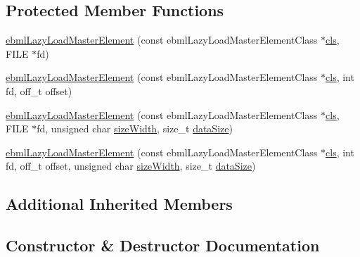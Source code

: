 \subsection*{Protected Member Functions}
\begin{DoxyCompactItemize}
\item 
\mbox{\hyperlink{classebml_1_1ebmlLazyLoadMasterElement_a7f1782a749ad36b8b453127c3ad105be}{ebml\+Lazy\+Load\+Master\+Element}} (const ebml\+Lazy\+Load\+Master\+Element\+Class $\ast$\mbox{\hyperlink{classebml_1_1ebmlMasterElement_a4073fb3f7ce3dda153384821714df29e}{cls}}, F\+I\+LE $\ast$fd)
\item 
\mbox{\hyperlink{classebml_1_1ebmlLazyLoadMasterElement_aea3907db2e2f01ed0cb84f4a2087d22e}{ebml\+Lazy\+Load\+Master\+Element}} (const ebml\+Lazy\+Load\+Master\+Element\+Class $\ast$\mbox{\hyperlink{classebml_1_1ebmlMasterElement_a4073fb3f7ce3dda153384821714df29e}{cls}}, int fd, off\+\_\+t offset)
\item 
\mbox{\hyperlink{classebml_1_1ebmlLazyLoadMasterElement_a483a45f586e945477f6f71cd2044c46b}{ebml\+Lazy\+Load\+Master\+Element}} (const ebml\+Lazy\+Load\+Master\+Element\+Class $\ast$\mbox{\hyperlink{classebml_1_1ebmlMasterElement_a4073fb3f7ce3dda153384821714df29e}{cls}}, F\+I\+LE $\ast$fd, unsigned char \mbox{\hyperlink{classebml_1_1ebmlElement_a8f324bc8c7d54856a51592204d5012b2}{size\+Width}}, size\+\_\+t \mbox{\hyperlink{classebml_1_1ebmlLazyLoadMasterElement_a85e983901d2d66f042b803a62664d725}{data\+Size}})
\item 
\mbox{\hyperlink{classebml_1_1ebmlLazyLoadMasterElement_a75139874462a9f5888a06a10b0b1d7fa}{ebml\+Lazy\+Load\+Master\+Element}} (const ebml\+Lazy\+Load\+Master\+Element\+Class $\ast$\mbox{\hyperlink{classebml_1_1ebmlMasterElement_a4073fb3f7ce3dda153384821714df29e}{cls}}, int fd, off\+\_\+t offset, unsigned char \mbox{\hyperlink{classebml_1_1ebmlElement_a8f324bc8c7d54856a51592204d5012b2}{size\+Width}}, size\+\_\+t \mbox{\hyperlink{classebml_1_1ebmlLazyLoadMasterElement_a85e983901d2d66f042b803a62664d725}{data\+Size}})
\end{DoxyCompactItemize}
\subsection*{Additional Inherited Members}


\subsection{Constructor \& Destructor Documentation}
\mbox{\label{classebml_1_1ebmlLazyLoadMasterElement_a7f1782a749ad36b8b453127c3ad105be}} 

